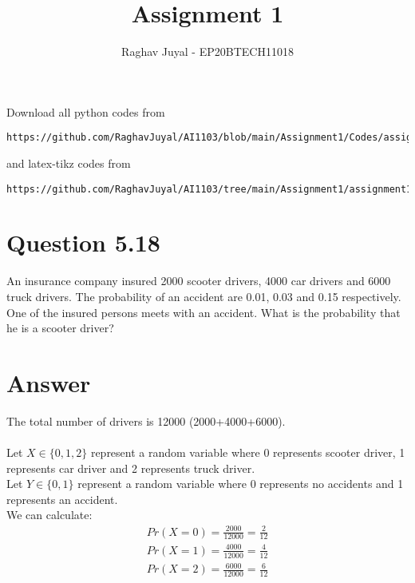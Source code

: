 \documentclass[journal,12pt,twocolumn]{IEEEtran}
\begin{document}
     \def\rightbox#1{\makebox[0in][r]{#1}}
     \def\centbox#1{\makebox[0in]{#1}}
     \def\topbox#1{\raisebox{-\baselineskip}[0in][0in]{#1}}
     \def\midbox#1{\raisebox{-0.5\baselineskip}[0in][0in]{#1}}
\vspace{3cm}
\title{Assignment 1}
\author{Raghav Juyal - EP20BTECH11018}
\maketitle
\newpage
\bigskip
\renewcommand{\thefigure}{\theenumi}
\renewcommand{\thetable}{\theenumi}
Download all python codes from 
\begin{lstlisting}
https://github.com/RaghavJuyal/AI1103/blob/main/Assignment1/Codes/assignment1.py
\end{lstlisting}
%
and latex-tikz codes from 
%
\begin{lstlisting}
https://github.com/RaghavJuyal/AI1103/tree/main/Assignment1/assignment1.tex
\end{lstlisting}
\section*{Question 5.18}
An insurance company insured 2000 scooter drivers, 4000 car drivers and 6000 truck drivers. The probability of an accident are 0.01, 0.03 and 0.15 respectively. One of the insured persons meets with an accident. What is the probability that he is a scooter driver?

\section*{Answer}
The total number of drivers is 12000 (2000+4000+6000).\\
\\ Let $X \in \{0,1,2\}$ represent a random variable where 0 represents scooter driver, 1 represents car driver and 2 represents truck driver.
\\ Let $Y \in \{0,1\}$ represent a random variable where 0 represents no accidents and 1 represents an accident.\\
We can calculate:\\
\begin{align}
    Pr(X=0) = \frac{2000}{12000} = \frac{2}{12}\\
    Pr(X=1) = \frac{4000}{12000} = \frac{4}{12}\\
    Pr(X=2) = \frac{6000}{12000} = \frac{6}{12}
\end{align}
\end{document}
